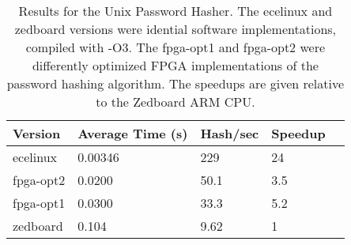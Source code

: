 \begin{table}[h]
\begin{tabular}{@{}lllll@{}}
\toprule
  Version   & Average Time (s) & Hash/sec & Speedup \\ \midrule
  ecelinux  & 0.00346          & 229      & 24      \\
  fpga-opt2 & 0.0200           & 50.1     & 3.5     \\
  fpga-opt1 & 0.0300           & 33.3     & 5.2     \\
  zedboard  & 0.104            & 9.62     & 1       \\ \bottomrule
\end{tabular}
\caption {Results for the Unix Password Hasher. The ecelinux and zedboard versions were idential software
  implementations, compiled with -O3. The fpga-opt1 and fpga-opt2 were differently optimized FPGA
  implementations of the password hashing algorithm. The speedups are given relative to the Zedboard ARM
  CPU.}
\label{table:hashresults}
\end{table}
